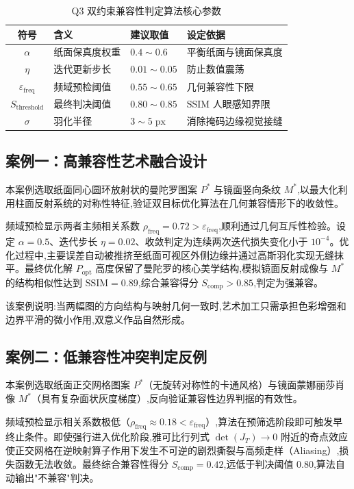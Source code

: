 \documentclass[12pt, a4paper]{ctexart}
\begin{document}
\begin{table}[htbp]
\centering
\caption{Q3 双约束兼容性判定算法核心参数}
\label{tab:q3-params}
\begin{tabular}{clll}
\toprule
\textbf{符号} & \textbf{含义} & \textbf{建议取值} & \textbf{设定依据} \\
\midrule
$\alpha$ & 纸面保真度权重 & $0.4\sim0.6$ & 平衡纸面与镜面保真度 \\
$\eta$ & 迭代更新步长 & $0.01\sim0.05$ & 防止数值震荡 \\
$\varepsilon_{\mathrm{freq}}$ & 频域预检阈值 & $0.55\sim0.65$ & 几何兼容性下限 \\
$S_{\mathrm{threshold}}$ & 最终判决阈值 & $0.80\sim0.85$ & SSIM 人眼感知界限 \\
$\sigma$ & 羽化半径 & $3\sim5\;\mathrm{px}$ & 消除掩码边缘视觉接缝 \\
\bottomrule
\end{tabular}
\end{table}

\subsection{案例一：高兼容性艺术融合设计}

本案例选取纸面同心圆环放射状的曼陀罗图案 $P^*$ 与镜面竖向条纹 $M^*$,以最大化利用柱面反射系统的对称性特征,验证双目标优化算法在几何兼容情形下的收敛性。

频域预检显示两者主频相关系数 $\rho_{\mathrm{freq}} = 0.72 > \varepsilon_{\mathrm{freq}}$,顺利通过几何互斥性检验。设定 $\alpha = 0.5$、迭代步长 $\eta = 0.02$、收敛判定为连续两次迭代损失变化小于 $10^{-4}$。优化过程中,主要误差自动被推挤至纸面可视区外侧边缘并通过高斯羽化实现无缝抹平。最终优化解 $P_{\mathrm{opt}}$ 高度保留了曼陀罗的核心美学结构,模拟镜面反射成像与 $M^*$ 的结构相似性达到 $\mathrm{SSIM} = 0.89$,综合兼容得分 $S_{\mathrm{comp}} > 0.85$,判定为强兼容。

该案例说明:当两幅图的方向结构与映射几何一致时,艺术加工只需承担色彩增强和边界平滑的微小作用,双意义作品自然形成。

\subsection{案例二：低兼容性冲突判定反例}

本案例选取纸面正交网格图案 $P^*$（无旋转对称性的卡通风格）与镜面蒙娜丽莎肖像 $M^*$（具有复杂面状灰度梯度）,反向验证兼容性边界判据的有效性。

频域预检显示相关系数极低（$\rho_{\mathrm{freq}} \approx 0.18 < \varepsilon_{\mathrm{freq}}$）,算法在预筛选阶段即可触发早终止条件。即使强行进入优化阶段,雅可比行列式 $\det(J_T) \to 0$ 附近的奇点效应使正交网格在逆映射算子作用下发生不可逆的剧烈撕裂与高频走样（Aliasing）,损失函数无法收敛。最终综合兼容性得分 $S_{\mathrm{comp}} = 0.42$,远低于判决阈值 $0.80$,算法自动输出"不兼容"判决。
\end{document}
